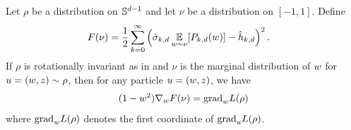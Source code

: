 \begin{lemma} \label{lemma:velocity_1d_equivalence}
Let $\rho$ be a distribution on $\mathbb{S}^{d - 1}$ and let $\nu$ be a distribution on $[-1, 1]$. Define
\begin{align}
F(\nu)
& = \frac{1}{2} \sum_{k = 0}^\infty \Big( \hat{\sigma}_{k, d}\operatorname*{\mathbb{E}}_{w \sim \nu} [P_{k, d}(w)] - \hat{h}_{k,d} \Big)^2 \,.
\end{align}
If $\rho$ is rotationally invariant as in  and $\nu$ is the marginal distribution of $w$ for $u = (w, z) \sim \rho$, then for any particle $u = (w, z)$, we have
\begin{align}
(1 - w^2) \nabla_w F(\nu) = {\textup{grad}}_w L(\rho)
\end{align}
where ${\textup{grad}}_w L(\rho)$ denotes the first coordinate of ${\textup{grad}}_u L(\rho)$.
\end{lemma}
